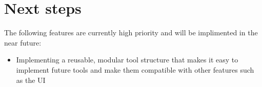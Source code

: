 \documentclass[a4paper, 12pt]{article}
\begin{document}
\section{Next steps}
The following features are currently high priority and will be implimented in the near future:
\begin{itemize}
\item Implementing a reusable, modular tool structure that makes it easy to implement future tools and make them compatible with other features such as the UI
\end{itemize}
\end{document}
